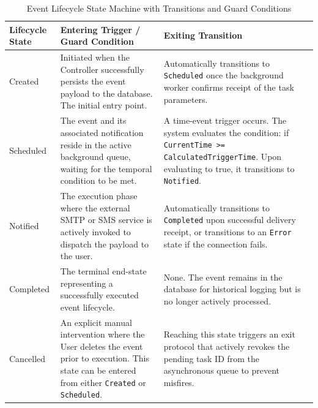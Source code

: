 \begin{table}[h]
	\centering
	\caption{Event Lifecycle State Machine with Transitions and Guard Conditions}
	\label{tab:event-state-machine}
	\renewcommand{\arraystretch}{1.3}
	\begin{tabular}{|>{\raggedright\arraybackslash}p{}|>{\raggedright\arraybackslash}p{}|>{\raggedright\arraybackslash}p{}|}
		\hline
		\textbf{Lifecycle State} & \textbf{Entering Trigger / Guard Condition} & \textbf{Exiting Transition} \\
		\hline
		Created &
		Initiated when the Controller successfully persists the event payload to the database. The initial entry point. &
		Automatically transitions to \texttt{Scheduled} once the background worker confirms receipt of the task parameters. \\
		\hline
		Scheduled &
		The event and its associated notification reside in the active background queue, waiting for the temporal condition to be met. &
		A time-event trigger occurs. The system evaluates the condition: if \texttt{CurrentTime >= CalculatedTriggerTime}. Upon evaluating to true, it transitions to \texttt{Notified}. \\
		\hline
		Notified &
		The execution phase where the external SMTP or SMS service is actively invoked to dispatch the payload to the user. &
		Automatically transitions to \texttt{Completed} upon successful delivery receipt, or transitions to an \texttt{Error} state if the connection fails. \\
		\hline
		Completed &
		The terminal end-state representing a successfully executed event lifecycle. &
		None. The event remains in the database for historical logging but is no longer actively processed. \\
		\hline
		Cancelled &
		An explicit manual intervention where the User deletes the event prior to execution. This state can be entered from either \texttt{Created} or \texttt{Scheduled}. &
		Reaching this state triggers an exit protocol that actively revokes the pending task ID from the asynchronous queue to prevent misfires. \\
		\hline
	\end{tabular}
\end{table}